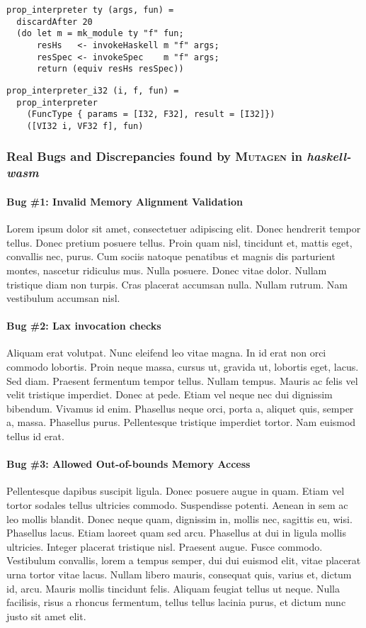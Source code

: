 \documentclass[acmsmall, anonymous]{acmart}
\newcommand{\mutagen}{\textsc{Mutagen}\xspace}
\begin{document}
\begin{verbatim}
prop_interpreter ty (args, fun) =
  discardAfter 20
  (do let m = mk_module ty "f" fun;
      resHs   <- invokeHaskell m "f" args;
      resSpec <- invokeSpec    m "f" args;
      return (equiv resHs resSpec))
\end{verbatim}

\begin{verbatim}
prop_interpreter_i32 (i, f, fun) =
  prop_interpreter
    (FuncType { params = [I32, F32], result = [I32]})
    ([VI32 i, VF32 f], fun)
\end{verbatim}


\subsubsection{Real Bugs and Discrepancies found by \mutagen in \textit{haskell-wasm}}

\paragraph{Bug \#1: Invalid Memory Alignment Validation}
Lorem ipsum dolor sit amet, consectetuer adipiscing elit. Donec hendrerit tempor
tellus. Donec pretium posuere tellus. Proin quam nisl, tincidunt et, mattis
eget, convallis nec, purus. Cum sociis natoque penatibus et magnis dis
parturient montes, nascetur ridiculus mus. Nulla posuere. Donec vitae dolor.
Nullam tristique diam non turpis. Cras placerat accumsan nulla. Nullam rutrum.
Nam vestibulum accumsan nisl.

\paragraph{Bug \#2: Lax invocation checks}
Aliquam erat volutpat. Nunc eleifend leo vitae magna. In id erat non orci
commodo lobortis. Proin neque massa, cursus ut, gravida ut, lobortis eget,
lacus. Sed diam. Praesent fermentum tempor tellus. Nullam tempus. Mauris ac
felis vel velit tristique imperdiet. Donec at pede. Etiam vel neque nec dui
dignissim bibendum. Vivamus id enim. Phasellus neque orci, porta a, aliquet
quis, semper a, massa. Phasellus purus. Pellentesque tristique imperdiet tortor.
Nam euismod tellus id erat.


\paragraph{Bug \#3: Allowed Out-of-bounds Memory Access}
Pellentesque dapibus suscipit ligula. Donec posuere augue in quam. Etiam vel
tortor sodales tellus ultricies commodo. Suspendisse potenti. Aenean in sem ac
leo mollis blandit. Donec neque quam, dignissim in, mollis nec, sagittis eu,
wisi. Phasellus lacus. Etiam laoreet quam sed arcu. Phasellus at dui in ligula
mollis ultricies. Integer placerat tristique nisl. Praesent augue. Fusce
commodo. Vestibulum convallis, lorem a tempus semper, dui dui euismod elit,
vitae placerat urna tortor vitae lacus. Nullam libero mauris, consequat quis,
varius et, dictum id, arcu. Mauris mollis tincidunt felis. Aliquam feugiat
tellus ut neque. Nulla facilisis, risus a rhoncus fermentum, tellus tellus
lacinia purus, et dictum nunc justo sit amet elit.
\end{document}
